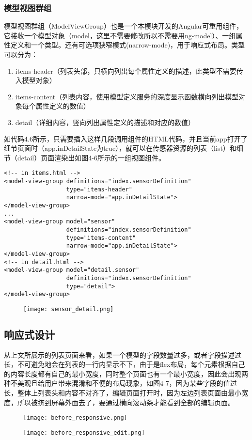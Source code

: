 \subsubsection{模型视图群组}
模型视图群组（ModelViewGroup）也是一个本模块开发的Angular可重用组件，它接收一个模型对象（model，这里不需要修改所以不需要用ng-model）、一组属性定义和一个类型。还有可选项狭窄模式(narrow-mode)，用于响应式布局。类型可以分为：
\begin{enumerate}
  \item items-header（列表头部，只横向列出每个属性定义的描述，此类型不需要传入模型对象）
  \item items-content（列表内容，使用模型定义服务的深度显示函数横向列出模型对象每个属性定义的数值）
  \item detail（详细内容，竖向列出属性定义的描述和对应的数值）
\end{enumerate}
如代码4.6所示，只需要插入这样几段调用组件的HTML代码，并且当前app打开了细节页面时（app.inDetailState为true），就可以在传感器资源的列表（list）和细节（detail）页面渲染出如图4-6所示的一组视图组件。
\begin{lstlisting}[language={HTML5}, caption={传感器列表页面中的模型输入群组代码}]
<!-- in items.html -->
<model-view-group definitions="index.sensorDefinition"
                  type="items-header"
                  narrow-mode="app.inDetailState">
</model-view-group>
...
<model-view-group model="sensor"
                  definitions="index.sensorDefinition"
                  type="items-content"
                  narrow-mode="app.inDetailState">
</model-view-group>
<!-- in detail.html -->
<model-view-group model="detail.sensor"
                  definitions="index.sensorDefinition"
                  type="detail">
</model-view-group>
\end{lstlisting}
\begin{figure}[!htp]
 \centering
 \texttt{[image: sensor\_detail.png]}
\end{figure}
\subsection{响应式设计}
从上文所展示的列表页面来看，如果一个模型的字段数量过多，或者字段描述过长，不可避免地会在列表的一行内显示不下，由于是flex布局，每个元素根据自己的内容长度都有自己的最小宽度，同时整个页面也有一个最小宽度，因此会出现两种不美观且给用户带来混淆和不便的布局现象，如图4-7，因为某些字段的值过长，整体上列表头和内容不对齐了，编辑页面打开时，因为左边列表页面由最小宽度，所以被挤到屏幕外面去了，要通过横向滚动条才能看到全部的编辑页面。
\begin{figure}[!htp]
 \centering
 \texttt{[image: before\_responsive.png]}

 \vspace{0.5cm}

 \texttt{[image: before\_responsive\_edit.png]}
\end{figure}

